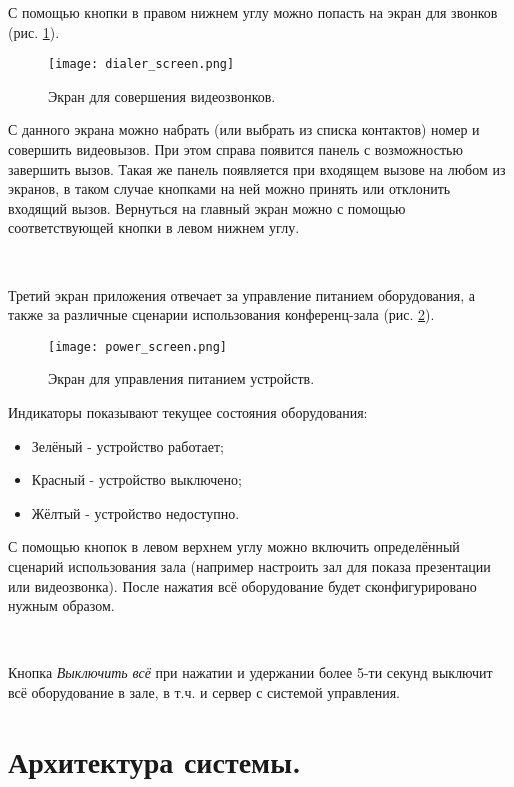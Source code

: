 \noindent С помощью кнопки в правом нижнем углу можно попасть на экран для звонков (рис. \ref{fig:dialer_screen}).

\begin{figure}[h]
    \centering
    \texttt{[image: dialer\_screen.png]}
    \caption{Экран для совершения видеозвонков.}
    \label{fig:dialer_screen}
\end{figure}

\noindent С данного экрана можно набрать (или выбрать из списка контактов) номер и совершить видеовызов. При этом справа
появится панель с возможностью завершить вызов. Такая же панель появляется при входящем вызове на любом из экранов,
в таком случае кнопками на ней можно принять или отклонить входящий вызов. Вернуться на главный экран можно с помощью
соответствующей кнопки в левом нижнем углу.

~\

\noindent Третий экран приложения отвечает за управление питанием оборудования, а также за различные сценарии использования
конференц-зала (рис. \ref{fig:power_screen}).

\begin{figure}[h]
    \centering
    \texttt{[image: power\_screen.png]}
    \caption{Экран для управления питанием устройств.}
    \label{fig:power_screen}
\end{figure}

\noindent Индикаторы показывают текущее состояния оборудования:

\begin{itemize}
    \item Зелёный - устройство работает;
    \item Красный - устройство выключено;
    \item Жёлтый - устройство недоступно.
\end{itemize}

\noindent С помощью кнопок в левом верхнем углу можно включить определённый сценарий
использования зала (например настроить зал для показа презентации или видеозвонка). После нажатия всё оборудование
будет сконфигурировано нужным образом.

~\

\noindent Кнопка \textit{Выключить всё} при нажатии и удержании более 5-ти секунд выключит всё оборудование в зале, в т.ч.
и сервер с системой управления.

\clearpage

\section{Архитектура системы.}

